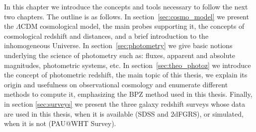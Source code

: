 In this chapter we introduce the concepts and tools necessary to follow the next two chapters. The outline is as follows. In section~\ref{sec:cosmo_model} we present the $\Lambda$CDM cosmological model, the main probes supporting it, the concepts of cosmological redshift and distances, and a brief introduction to the inhomogeneous Universe. In section~\ref{sec:photometry} we give basic notions underlying the science of photometry such as: fluxes, apparent and absolute magnitudes, photometric systems, etc. In section~\ref{sec:theo_photoz} we introduce the concept of photometric redshift, the main topic of this thesis, we explain its origin and usefulness on observational cosmology and enumerate different methods to compute it, emphasizing the BPZ method \citep{Benitez2000} used in this thesis. Finally, in section \ref{sec:surveys} we present the three galaxy redshift surveys whose data are used in this thesis, when it is available (SDSS and 2dFGRS), or simulated, when it is not (PAU@WHT Survey).
